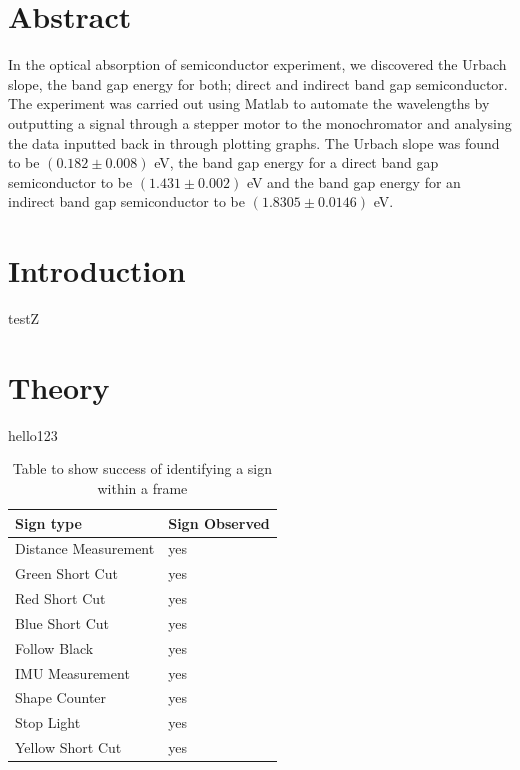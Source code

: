 \documentclass[12pt]{article}
\begin{document}

\tableofcontents
\pagebreak


\section{Abstract}
In the optical absorption of semiconductor experiment, we discovered the Urbach slope, the band gap energy for both; direct and indirect band gap semiconductor. The experiment was carried out using Matlab to automate the wavelengths by outputting a signal through a stepper motor to the monochromator and analysing the data inputted back in through plotting graphs. The Urbach slope was found to be $(0.182\pm0.008)$ eV, the band gap energy for a direct band gap semiconductor to be $(1.431\pm0.002)$ eV and the band gap energy for an indirect band gap semiconductor to be $(1.8305\pm0.0146)$ eV.


\section{Introduction}
testZ~\cite{pratt_2022}

\section{Theory}
hello123

\begin{table}[ht!]
    \centering
    \begin{tabular}{|l|l|}
        \hline
        Sign type            & Sign Observed \\ \hline
        Distance Measurement & yes           \\ \hline
        Green Short Cut      & yes           \\ \hline
        Red Short Cut        & yes           \\ \hline
        Blue Short Cut       & yes           \\ \hline
        Follow Black         & yes           \\ \hline
        IMU Measurement      & yes           \\ \hline
        Shape Counter        & yes           \\ \hline
        Stop Light           & yes           \\ \hline
        Yellow Short Cut     & yes           \\ \hline
    \end{tabular}
    \caption{Table to show success of identifying a sign within a frame}
    \label{tab:identifying a sign within a frame}
\end{table}
\end{document}
